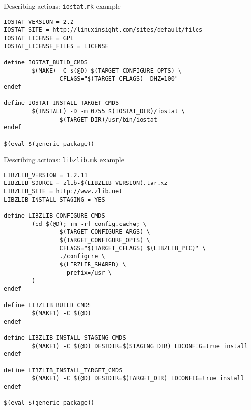 \begin{frame}[fragile]{Describing actions: {\tt iostat.mk} example}
  \begin{block}{}
    \begin{verbatim}
IOSTAT_VERSION = 2.2
IOSTAT_SITE = http://linuxinsight.com/sites/default/files
IOSTAT_LICENSE = GPL
IOSTAT_LICENSE_FILES = LICENSE

define IOSTAT_BUILD_CMDS
        $(MAKE) -C $(@D) $(TARGET_CONFIGURE_OPTS) \
                CFLAGS="$(TARGET_CFLAGS) -DHZ=100"
endef

define IOSTAT_INSTALL_TARGET_CMDS
        $(INSTALL) -D -m 0755 $(IOSTAT_DIR)/iostat \
                $(TARGET_DIR)/usr/bin/iostat
endef

$(eval $(generic-package))
    \end{verbatim}
  \end{block}
\end{frame}

\begin{frame}[fragile]{Describing actions: {\tt libzlib.mk} example}
  \begin{block}{}
    \begin{verbatim}
LIBZLIB_VERSION = 1.2.11
LIBZLIB_SOURCE = zlib-$(LIBZLIB_VERSION).tar.xz
LIBZLIB_SITE = http://www.zlib.net
LIBZLIB_INSTALL_STAGING = YES

define LIBZLIB_CONFIGURE_CMDS
        (cd $(@D); rm -rf config.cache; \
                $(TARGET_CONFIGURE_ARGS) \
                $(TARGET_CONFIGURE_OPTS) \
                CFLAGS="$(TARGET_CFLAGS) $(LIBZLIB_PIC)" \
                ./configure \
                $(LIBZLIB_SHARED) \
                --prefix=/usr \
        )
endef

define LIBZLIB_BUILD_CMDS
        $(MAKE1) -C $(@D)
endef

define LIBZLIB_INSTALL_STAGING_CMDS
        $(MAKE1) -C $(@D) DESTDIR=$(STAGING_DIR) LDCONFIG=true install
endef

define LIBZLIB_INSTALL_TARGET_CMDS
        $(MAKE1) -C $(@D) DESTDIR=$(TARGET_DIR) LDCONFIG=true install
endef

$(eval $(generic-package))
    \end{verbatim}
  \end{block}
\end{frame}

